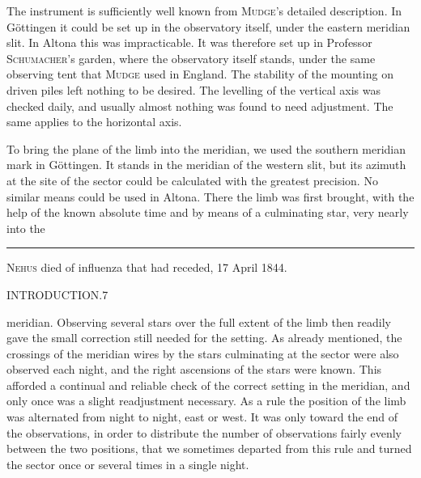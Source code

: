 The instrument is sufficiently well known from \textsc{Mudge}'s detailed description.
In Göttingen it could be set up in the observatory itself, under the eastern meridian slit.
In Altona this was impracticable. It was therefore set up in Professor \textsc{Schumacher}'s
garden, where the observatory itself stands, under the same observing tent that
\textsc{Mudge} used in England. The stability of the mounting on driven piles left nothing
to be desired. The levelling of the vertical axis was checked daily, and usually almost nothing
was found to need adjustment. The same applies to the horizontal axis.

To bring the plane of the limb into the meridian, we used the southern meridian mark in
Göttingen. It stands in the meridian of the western slit, but its azimuth at the site of the
sector could be calculated with the greatest precision. No similar means could be used in
Altona. There the limb was first brought, with the help of the known absolute time and by means
of a culminating star, very nearly into the

\vfill\noindent\rule{.24\textwidth}{.4pt}\par
{\footnotesize{} \textsc{Nehus} died of influenza that had receded, 17 April 1844.\par}

\clearpage
\noindent\mbox{}\hfill INTRODUCTION.\hfill 7\par
\noindent meridian. Observing several stars over the full extent of the limb then readily gave
the small correction still needed for the setting. As already mentioned, the crossings of the
meridian wires by the stars culminating at the sector were also observed each night, and the
right ascensions of the stars were known. This afforded a continual and reliable check of
the correct setting in the meridian, and only once was a slight readjustment necessary.
As a rule the position of the limb was alternated from night to night, east or west. It was
only toward the end of the observations, in order to distribute the number of observations
fairly evenly between the two positions, that we sometimes departed from this rule and turned
the sector once or several times in a single night.

